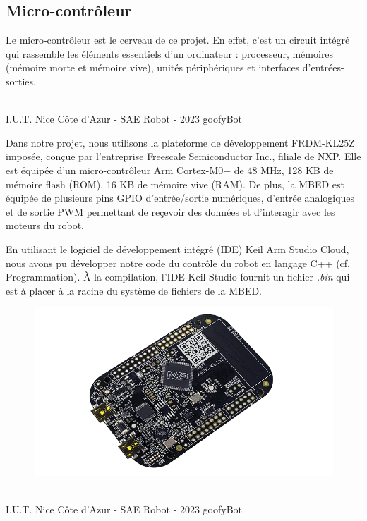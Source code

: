 \subsection{Micro-contrôleur}

Le micro-contrôleur est le cerveau de ce projet. En effet, c'est un circuit intégré qui rassemble les éléments essentiels d'un ordinateur : processeur, mémoires (mémoire morte et mémoire vive), unités périphériques et interfaces d'entrées-sorties. 

\vfill
\noindent\makebox[\linewidth]{\rule{.8\paperwidth}{.6pt}}\\[0.2cm]
I.U.T. Nice Côte d'Azur - SAE Robot - 2023 \hfill goofyBot
\noindent\makebox[\linewidth]{\rule{.8\paperwidth}{.6pt}}
\newpage

Dans notre projet, nous utilisons la plateforme de développement FRDM-KL25Z imposée, conçue par l'entreprise Freescale Semiconductor Inc., filiale de NXP. Elle est équipée d'un micro-contrôleur Arm Cortex-M0+ de 48 MHz, 128 KB de mémoire flash (ROM), 16 KB de mémoire vive (RAM). De plus, la MBED est équipée de plusieurs pins GPIO d'entrée/sortie numériques, d'entrée analogiques et de sortie PWM permettant de reçevoir des données et d'interagir avec les moteurs du robot.

En utilisant le logiciel de développement intégré (IDE) Keil Arm Studio Cloud, nous avons pu développer notre code du contrôle du robot en langage C++ (cf. Programmation). À la compilation, l'IDE Keil Studio fournit un fichier \emph{.bin} qui est à placer à la racine du système de fichiers de la MBED. 

\begin{figure}[H]
\centering
\begin{minipage}{.5\textwidth}
  \centering
  \centerline{\includegraphics[width=1\linewidth]{img/composants/frdmkl25z.png}}
  \label{fig:frdmkl25z}
\end{minipage}%
\end{figure}

\vfill
\noindent\makebox[\linewidth]{\rule{.8\paperwidth}{.6pt}}\\[0.2cm]
I.U.T. Nice Côte d'Azur - SAE Robot - 2023 \hfill goofyBot
\noindent\makebox[\linewidth]{\rule{.8\paperwidth}{.6pt}}
\newpage
